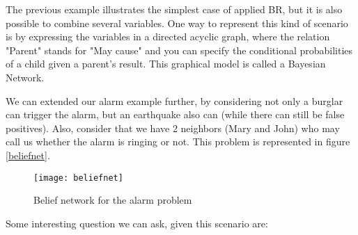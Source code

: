 The previous example illustrates the simplest case of applied BR, but it is
also possible to combine several variables.
One way to represent this kind of scenario is by expressing the variables in a directed acyclic
graph, where the relation "Parent" stands for "May cause" and you can specify
the conditional probabilities of a child given a parent's result. This graphical
model is called a Bayesian Network.

We can extended our alarm example further, by considering not only a burglar
can trigger the alarm, but an earthquake also can (while there can still be
false positives). Also, consider that we have 2 neighbors (Mary and John) who
may call us whether the alarm is ringing or not. This problem is represented in
figure \ref{beliefnet}.

\begin{figure}[t]
  \begin{center}
    \leavevmode
    \texttt{[image: beliefnet]}
    \caption{Belief network for the alarm problem \cite{}}
    \label{fig:beliefnet}
  \end{center}
\end{figure}

Some interesting question we can ask, given this scenario are:

